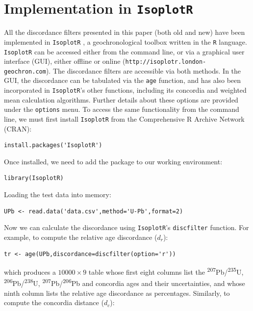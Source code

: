 \documentclass[gchron, manuscript]{copernicus}
\begin{document}
\section{Implementation in \texttt{IsoplotR}}
\label{sec:IsoplotR}

All the discordance filters presented in this paper (both old and new)
have been implemented in \texttt{IsoplotR} \citep{vermeesch2018c}, a
geochronological toolbox written in the \texttt{R}
language. \texttt{IsoplotR} can be accessed either from the command
line, or via a graphical user interface (GUI), either offline or
online (\texttt{http://isoplotr.london-geochron.com}).  The
discordance filters are accessible via both methods. In the GUI, the
discordance can be tabulated via the \texttt{age} function, and has
also been incorporated in \texttt{IsoplotR}'s other functions,
including its concordia and weighted mean calculation algorithms.
Further details about these options are provided under the
\texttt{options} menu. To access the same functionality from the
command line, we must first install \texttt{IsoplotR} from the
Comprehensive R Archive Network (CRAN):

\begin{verbatim}
install.packages('IsoplotR')
\end{verbatim}

\noindent Once installed, we need to add the package to our working
environment:

\begin{verbatim}
library(IsoplotR)
\end{verbatim}

\noindent Loading the test data into memory:

\begin{verbatim}
UPb <- read.data('data.csv',method='U-Pb',format=2)
\end{verbatim}

\noindent Now we can calculate the discordance using
\texttt{IsoplotR}'s \texttt{discfilter} function. For example, to
compute the relative age discordance ($d_r$):

\begin{verbatim}
tr <- age(UPb,discordance=discfilter(option='r'))
\end{verbatim}

\noindent which produces a ${10000}\times{9}$ table whose first eight
columns list the \textsuperscript{207}Pb/\textsuperscript{235}U,
\textsuperscript{206}Pb/\textsuperscript{238}U,
\textsuperscript{207}Pb/\textsuperscript{206}Pb and concordia ages and
their uncertainties, and whose ninth column lists the relative age
discordance as percentages. Similarly, to compute the concordia
distance ($d_c$):
\end{document}
